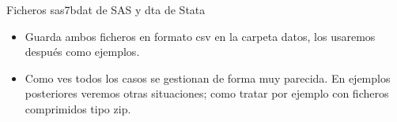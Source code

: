\documentclass[
  9pt,
  ignorenonframetext,
]{beamer}
\providecommand{\tightlist}{%
  \setlength{\itemsep}{0pt}\setlength{\parskip}{0pt}}
\begin{document}
\begin{frame}[fragile]
\begin{block}{Ficheros sas7bdat de SAS y dta de Stata}
\normalsize

\begin{itemize}
\tightlist
\item
  Guarda ambos ficheros en formato csv en la carpeta datos, los usaremos
  después como ejemplos.
\end{itemize}

\end{block}

\begin{block}{}

\begin{itemize}
\tightlist
\item
  Como ves todos los casos se gestionan de forma muy parecida. En
  ejemplos posteriores veremos otras situaciones; como tratar por
  ejemplo con ficheros comprimidos tipo zip.
\end{itemize}

\end{block}

\end{frame}
\end{document}
